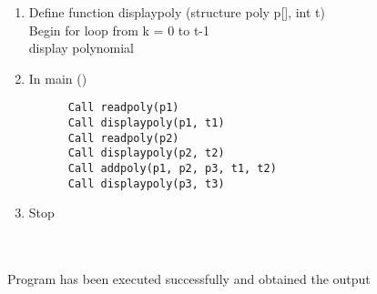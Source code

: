 \documentclass{article}
\begin{document}
\begin{enumerate}
    \item Define function displaypoly (structure poly p[], int t) \\
    Begin for loop from k = 0 to t-1 \\
    display polynomial

      
    \item In main ()
     \begin{verbatim}
      Call readpoly(p1)
      Call displaypoly(p1, t1)
      Call readpoly(p2)
      Call displaypoly(p2, t2)
      Call addpoly(p1, p2, p3, t1, t2)
      Call displaypoly(p3, t3)
     \end{verbatim}

    \item Stop
    
\end{enumerate}





\vspace{1cm}










 \\ \\
Program has been executed successfully and obtained the output
\end{document}
